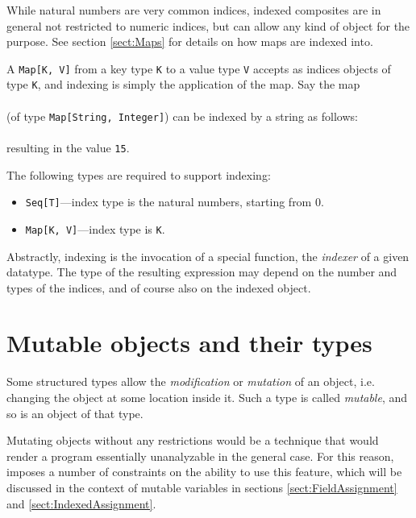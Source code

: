 While natural numbers are very common indices, indexed composites are
in general not restricted to numeric indices, but can  allow
any kind of object for the purpose.  See
section \ref{sect:Maps} for details on how maps are indexed into.

\begin{example}
A {\tt Map[K, V]} from a key type {\tt K} to a value
type {\tt V} accepts as indices objects of type {\tt K}, and indexing
is simply the application of the map. Say the map\\
\\
(of type {\tt Map[String, Integer]}) can be indexed by a string as follows:\\
\\
resulting in the value {\tt 15}.
\end{example}

The following \Cal types are required to support indexing:
\begin{itemize}
\item {\tt Seq[T]}---index type is the natural numbers, starting from 0.
\item {\tt Map[K, V]}---index type is {\tt K}.
\end{itemize}

Abstractly, indexing is the invocation of a special function, the {\em
  indexer} of a given datatype. The type of the resulting expression
may depend on the number and types of the indices, and of course also
on the indexed object.


\section{Mutable objects and their types}\label{sect:MutableTypes}

Some structured types allow the {\em modification} or {\em mutation} of an object,
i.e. changing the object at some location inside it. Such a type is
called {\em mutable}, and so is an object of that type.

Mutating objects without any restrictions would be a technique that
would render a program essentially unanalyzable in the general case.
For this reason, \Cal imposes a number of constraints on the ability
to use this feature, which will be discussed in the context of mutable
variables in sections \ref{sect:FieldAssignment} and
\ref{sect:IndexedAssignment}.

